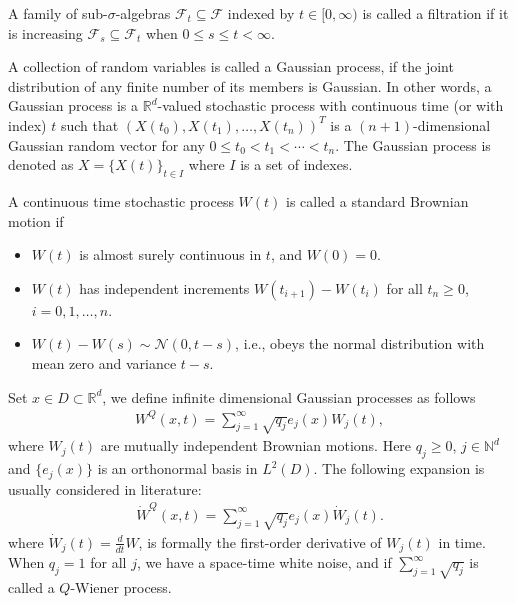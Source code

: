	\begin{definition}
		A family of sub-$\sigma$-algebras $\mathcal{F}_t \subseteq \mathcal{F}$ indexed by $t \in [0, \infty)$ is called a filtration if it is increasing $\mathcal{F}_s \subseteq \mathcal{F}_t$ when $0 \leq s \leq t < \infty$.
	\end{definition}
	
	\begin{definition} 
		A collection of random variables is called a Gaussian process, if the joint distribution of any finite number of its members is Gaussian. In other words, a Gaussian process is a $\mathbb{R}^d$-valued stochastic process with continuous time (or with index) $t$ such that $\left(X(t_0), X(t_1), \dots, X(t_n) \right)^T$ is a $(n+1)$-dimensional Gaussian random vector
		for any $0 \leq t_0 < t_1 < \cdots < t_n$. The Gaussian process is denoted as $X = \{X(t)\}_{t \in I}$ where $I$ is a set of indexes.
	\end{definition}
	
	\begin{definition}
		\label{brownian_motion}
		 A continuous time stochastic process $W(t)$ is called a standard Brownian motion if
		\begin{itemize}
			\item
			$W(t)$ is almost surely continuous in $t$, and $W(0) = 0$. 
			\item
			$W(t)$ has independent increments $W(t_{i+1}) - W(t_i)$ for all $t_n \geq 0$, $i = 0, 1, \dots, n$.
			\item
			$W(t) - W(s) \sim \mathcal{N} (0, t-s)$, i.e., obeys the normal distribution with mean zero and variance $t - s$.
		\end{itemize}	
	\end{definition}

	\noindent Set $x \in D \subset \mathbb{R}^d$, we define infinite dimensional Gaussian processes as follows
	\begin{align*}
		W^Q (x, t) = \displaystyle \sum^{\infty}_{j = 1} \sqrt{q_j} e_j (x) W_j (t),
	\end{align*}
	where $W_j (t)$ are mutually independent Brownian motions. Here $q_j \geq 0$, $j \in \mathbb{N}^d$ and $\{ e_j (x) \}$ is an orthonormal basis in $L^2 (D)$.  The following expansion is usually considered in literature:
	\begin{align*}
		\dot{W}^Q (x, t) = \displaystyle \sum^{\infty}_{j = 1} \sqrt{q_j} e_j (x) \dot{W}_j (t).
	\end{align*}
	where $\dot{W}_j (t) =\frac{d}{dt} W$, is formally the first-order derivative of $W_j (t)$ in time. When $q_j = 1$ for all $j$, we have a space-time white noise, and if $\sum^{\infty}_{j = 1} \sqrt{q_j}$ is called a $Q$-Wiener process. \\

